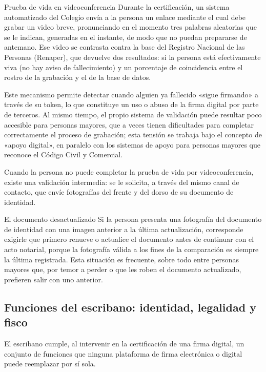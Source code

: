 \documentclass[12pt,oneside]{book}
\begin{document}
\begin{example}{Prueba de vida en videoconferencia}
Durante la certificación, un sistema automatizado del Colegio envía a la persona un enlace mediante el cual debe grabar un video breve, pronunciando en el momento tres palabras aleatorias que se le indican, generadas en el instante, de modo que no puedan prepararse de antemano. Ese video se contrasta contra la base del Registro Nacional de las Personas (Renaper), que devuelve dos resultados: si la persona está efectivamente viva (no hay aviso de fallecimiento) y un porcentaje de coincidencia entre el rostro de la grabación y el de la base de datos.
\end{example}

Este mecanismo permite detectar cuando alguien ya fallecido «sigue firmando» a través de su token, lo que constituye un uso o abuso de la firma digital por parte de terceros. Al mismo tiempo, el propio sistema de validación puede resultar poco accesible para personas mayores, que a veces tienen dificultades para completar correctamente el proceso de grabación; esta tensión se trabaja bajo el concepto de «apoyo digital», en paralelo con los sistemas de apoyo para personas mayores que reconoce el Código Civil y Comercial.

Cuando la persona no puede completar la prueba de vida por videoconferencia, existe una validación intermedia: se le solicita, a través del mismo canal de contacto, que envíe fotografías del frente y del dorso de su documento de identidad.

\begin{example}{El documento desactualizado}
Si la persona presenta una fotografía del documento de identidad con una imagen anterior a la última actualización, corresponde exigirle que primero renueve o actualice el documento antes de continuar con el acto notarial, porque la fotografía válida a los fines de la comparación es siempre la última registrada. Esta situación es frecuente, sobre todo entre personas mayores que, por temor a perder o que les roben el documento actualizado, prefieren salir con uno anterior.
\end{example}

\subsection{Funciones del escribano: identidad, legalidad y fisco}

El escribano cumple, al intervenir en la certificación de una firma digital, un conjunto de funciones que ninguna plataforma de firma electrónica o digital puede reemplazar por sí sola.
\end{document}
